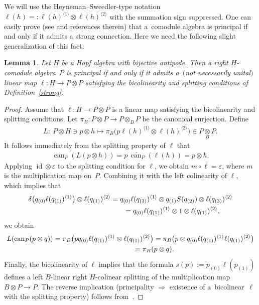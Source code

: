 \documentclass[pdftex]{sigma}
\numberwithin{equation}{section}
\newtheorem{Lemma}[Theorem]{Lemma}
{ \theoremstyle{definition}
\newtheorem{Definition}[Theorem]{Definition}
\newtheorem{Example}[Theorem]{Example}}
\begin{document}
We will use the  Heyneman--Sweedler-type notation
$
\ell(h)=:\ell(h)^{\langle 1 \rangle}\otimes
 \ell(h)^{\langle 2 \rangle}
$
 with the summation sign suppressed.
 One can easily prove (see \cite[p.~599]{hkmz11} and references therein) that
a~comodule algebra is principal if and only if it admits a strong
connection.
Here we need the following slight generalization of this fact:
\begin{Lemma}\label{general}
Let $H$ be a Hopf algebra with bijective antipode. Then a right $H$-comodule algebra~$P$ is principal if and
only if it admits a~$($not necessarily unital$)$ linear map $\ell \colon H \rightarrow  P \otimes  P$ satisfying the
bicolinearity and splitting conditions of Definition~{\rm \ref{strong}}.
\end{Lemma}

\begin{proof}
Assume that $\ell \colon H \rightarrow  P \otimes  P$ is a linear map satisfying the bicolinearity and splitting
conditions.
Let $\pi_B\colon P\otimes P\to P\otimes_BP$ be the canonical surjection. Def\/ine
\begin{gather*}
L\colon \ P\otimes H\ni p\otimes h\longmapsto \pi_B\big(p \ell(h)^{\langle 1\rangle}\otimes\ell(h)^{\langle 2\rangle}\big)\in P\underset{B}{\otimes}P.
\end{gather*}
It follows immediately from the  splitting property of $\ell$ that
\begin{gather*}
\operatorname{can}_P(L(p\otimes h))= p \, \widetilde{\operatorname{can}_P}(\ell(h))=p\otimes h.
\end{gather*}
Applying $\operatorname{id}\otimes\varepsilon$ to the splitting condition for $\ell$, we obtain $m\circ\ell=\varepsilon$, where $m$ is
the multiplication map on~$P$.
Combining it with the left colinearity of $\ell$, which implies that
\begin{gather*}
\delta\big(q_{(0)}\ell(q_{(1)})^{\langle 1\rangle}\big)\otimes\ell(q_{(1)})^{\langle 2\rangle}
=q_{(0)}\ell(q_{(3)})^{\langle 1\rangle}\otimes q_{(1)}S(q_{(2)})\otimes\ell(q_{(3)})^{\langle 2\rangle}\\
\hphantom{\delta\big(q_{(0)}\ell(q_{(1)})^{\langle 1\rangle}\big)\otimes\ell(q_{(1)})^{\langle 2\rangle}}{}
=q_{(0)}\ell(q_{(1)})^{\langle 1\rangle}\otimes 1\otimes\ell(q_{(1)})^{\langle 2\rangle},
\end{gather*}
we obtain
\begin{gather*}
L(\operatorname{can}_P(p\otimes q)) = \pi_B \big(pq_{(0)} \ell(q_{(1)})^{\langle 1\rangle}
 \otimes  \ell(q_{(1)})^{\langle 2\rangle}\big)
 = \pi_B \big(p \otimes q_{(0)} \ell(q_{(1)})^{\langle 1\rangle} \ell(q_{(1)})^{\langle 2\rangle}\big)
 \\
\hphantom{L(\operatorname{can}_P(p\otimes q))}{}
=  \pi_B(p\otimes q).
\end{gather*}
Finally, the bicolinearity of $\ell$ implies that the formula $s(p):= p_{(0)}\ell(p_{(1)})$ def\/ines a left $B$-linear
right $H$-colinear splitting
of the multiplication map $B\otimes P\to P$. The reverse implication (principality $\Rightarrow$ existence of a~bicolinear~$\ell$ with the splitting property)
follows from~\cite[Lemma~2.2]{bh04}.
\end{proof}
\end{document}
